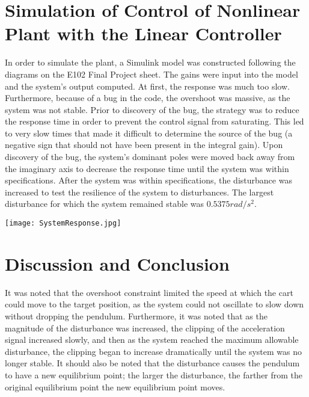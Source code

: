 \documentclass[12pt]{article}
\begin{document}
\section{Simulation of Control of Nonlinear Plant with the Linear Controller}
In order to simulate the plant, a Simulink model was constructed following the diagrams on the E102 Final Project sheet.  The gains were input into the model and the system's output computed.  At first, the response was much too slow.  Furthermore, because of a bug in the code, the overshoot was massive, as the system was not stable.  Prior to discovery of the bug, the strategy was to reduce the response time in order to prevent the control signal from saturating.  This led to very slow times that made it difficult to determine the source of the bug (a negative sign that should not have been present in the integral gain).  Upon discovery of the bug, the system's dominant poles were moved back away from the imaginary axis to decrease the response time until the system was within specifications.  After the system was within specifications, the disturbance was increased to test the resilience of the system to disturbances.  The largest disturbance for which the system remained stable was $0.5375rad/s^2$.


\texttt{[image: SystemResponse.jpg]} 

\section{Discussion and Conclusion}
It was noted that the overshoot constraint limited the speed at which the cart could move to the target position, as the system could not oscillate to slow down without dropping the pendulum.  Furthermore, it was noted that as the magnitude of the disturbance was increased, the clipping of the acceleration signal increased slowly, and then as the system reached the maximum allowable disturbance, the clipping began to increase dramatically until the system was no longer stable.  It should also be noted that the disturbance causes the pendulum to have a new equilibrium point; the larger the disturbance, the farther from the original equilibrium point the new equilibrium point moves.
\end{document}
